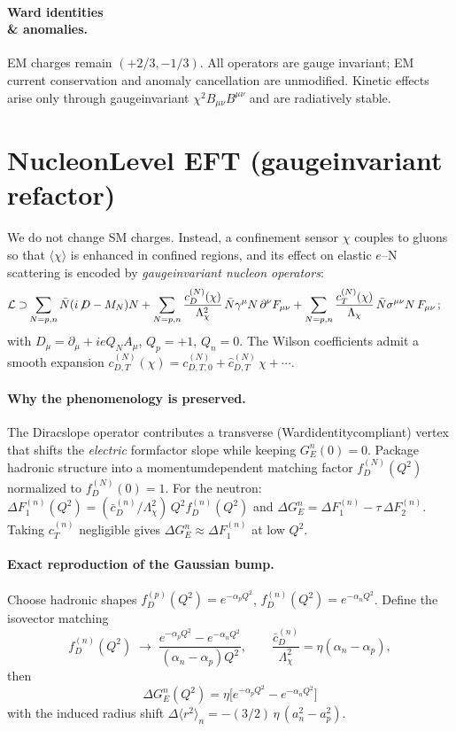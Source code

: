\documentclass[11pt]{article}
\newcommand{\GN}{G_E^n}
\newcommand{\Lag}{\mathcal{L}}
\begin{document}
\paragraph{Ward identities \\& anomalies.} EM charges remain $(+2/3,-1/3)$. All operators are gauge invariant; EM current conservation and anomaly cancellation are unmodified. Kinetic effects arise only through gauge\mbox{\textendash}invariant $\chi^2 B_{\mu\nu}B^{\mu\nu}$ and are radiatively stable.

\section{Nucleon\mbox{\textendash}Level EFT (gauge\mbox{\textendash}invariant refactor)}
We do not change SM charges. Instead, a confinement sensor $\chi$ couples to gluons so that $\langle\chi\rangle$ is enhanced in confined regions, and its effect on elastic $e$--N scattering is encoded by \emph{gauge\mbox{\textendash}invariant nucleon operators}:
\begin{align}
\Lag \supset &\sum_{N=p,n}\bar N(i\!\not\! D-M_N)N
+\sum_{N=p,n}\frac{c_D^{(N)}(\chi)}{\Lambda_\chi^2}\,\bar N\gamma^\mu N\,\partial^\nu F_{\mu\nu}
+\sum_{N=p,n}\frac{c_T^{(N)}(\chi)}{\Lambda_\chi}\,\bar N\sigma^{\mu\nu}N\,F_{\mu\nu}\,;
\end{align}
with $D_\mu=\partial_\mu+ieQ_NA_\mu$, $Q_p=+1$, $Q_n=0$. The Wilson coefficients admit a smooth expansion $c_{D,T}^{(N)}(\chi)=c_{D,T,0}^{(N)}+\hat c_{D,T}^{(N)}\,\chi+\cdots$.

\paragraph{Why the phenomenology is preserved.} The Dirac\mbox{\textendash}slope operator contributes a transverse (Ward\mbox{\textendash}identity\mbox{\textendash}compliant) vertex that shifts the \emph{electric} form\mbox{\textendash}factor slope while keeping $\GN(0)=0$. Package hadronic structure into a momentum\mbox{\textendash}dependent matching factor $f_D^{(N)}(Q^2)$ normalized to $f_D^{(N)}(0)=1$. For the neutron: $\Delta F_1^{(n)}(Q^2)=(\bar c_D^{(n)}/\Lambda_\chi^2)\,Q^2 f_D^{(n)}(Q^2)$ and $\Delta \GN=\Delta F_1^{(n)}-\tau\,\Delta F_2^{(n)}$. Taking $c_T^{(n)}$ negligible gives $\Delta \GN\approx\Delta F_1^{(n)}$ at low $Q^2$.

\paragraph{Exact reproduction of the Gaussian bump.} Choose hadronic shapes $f_D^{(p)}(Q^2)=e^{-\alpha_p Q^2}$, $f_D^{(n)}(Q^2)=e^{-\alpha_n Q^2}$. Define the isovector matching
\begin{equation}
 f_D^{(n)}(Q^2)\;\to\; \frac{e^{-\alpha_p Q^2}-e^{-\alpha_n Q^2}}{(\alpha_n-\alpha_p)Q^2},\qquad \frac{\bar c_D^{(n)}}{\Lambda_\chi^2}=\eta(\alpha_n-\alpha_p),
\end{equation}
then
\begin{equation}
\boxed{\;\Delta \GN(Q^2)=\eta\big[e^{-\alpha_p Q^2}-e^{-\alpha_n Q^2}\big]\;}
\end{equation}
with the induced radius shift $\Delta\langle r^2\rangle_n=-(3/2)\,\eta\,(a_n^2-a_p^2)$.
\end{document}
